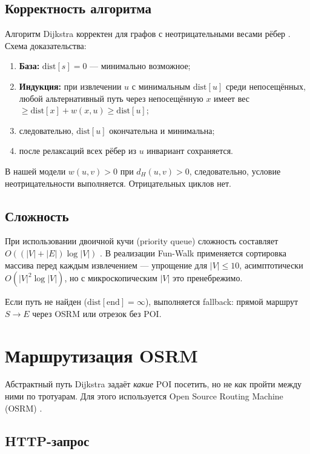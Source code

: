 \subsection{Корректность алгоритма}

Алгоритм Dijkstra корректен для графов с неотрицательными весами рёбер
\cite{dijkstra1959,cormen2022,kormen2022ru}. Схема доказательства:
\begin{enumerate}
  \item \textbf{База:} $\mathrm{dist}[s] = 0$ --- минимально возможное;
  \item \textbf{Индукция:} при извлечении $u$ с минимальным $\mathrm{dist}[u]$
        среди непосещённых, любой альтернативный путь через непосещённую $x$
        имеет вес $\geq \mathrm{dist}[x] + w(x,u) \geq \mathrm{dist}[u]$;
  \item следовательно, $\mathrm{dist}[u]$ окончательна и минимальна;
  \item после релаксаций всех рёбер из $u$ инвариант сохраняется.
\end{enumerate}

В нашей модели $w(u,v) > 0$ при $d_H(u,v) > 0$, следовательно, условие
неотрицательности выполняется. Отрицательных циклов нет.

\subsection{Сложность}

При использовании двоичной кучи (priority queue) сложность составляет
$O((|V| + |E|) \log |V|)$ \cite{cormen2022}. В реализации Fun-Walk применяется
сортировка массива перед каждым извлечением --- упрощение для $|V| \leq 10$,
асимптотически $O(|V|^2 \log |V|)$, но с микроскопическим $|V|$ это пренебрежимо.

Если путь не найден ($\mathrm{dist}[\mathrm{end}] = \infty$), выполняется fallback:
прямой маршрут $S \to E$ через OSRM или отрезок без POI.

\section{Маршрутизация OSRM}

Абстрактный путь Dijkstra задаёт \emph{какие} POI посетить, но не \emph{как} пройти
между ними по тротуарам. Для этого используется Open Source Routing Machine (OSRM)
\cite{luxen-vetter2011,osrm2024}.

\subsection{HTTP-запрос}

